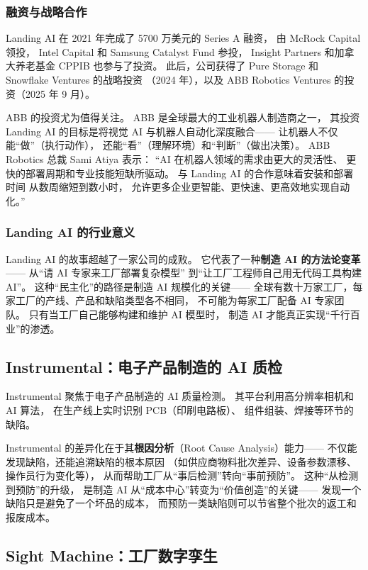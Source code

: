 \subsubsection{融资与战略合作}
Landing AI 在 2021 年完成了 5700 万美元的 Series A 融资，
由 McRock Capital 领投，
Intel Capital 和 Samsung Catalyst Fund 参投，
Insight Partners 和加拿大养老基金 CPPIB 也参与了投资。
此后，公司获得了 Pure Storage 和 Snowflake Ventures 的战略投资
（2024 年），以及 ABB Robotics Ventures 的投资（2025 年 9 月）。

ABB 的投资尤为值得关注。
ABB 是全球最大的工业机器人制造商之一，
其投资 Landing AI 的目标是将视觉 AI 与机器人自动化深度融合——
让机器人不仅能``做''（执行动作），
还能``看''（理解环境）和``判断''（做出决策）。
ABB Robotics 总裁 Sami Atiya 表示：
``AI 在机器人领域的需求由更大的灵活性、
更快的部署周期和专业技能短缺所驱动。
与 Landing AI 的合作意味着安装和部署时间
从数周缩短到数小时，
允许更多企业更智能、更快速、更高效地实现自动化。''

\subsubsection{Landing AI 的行业意义}
Landing AI 的故事超越了一家公司的成败。
它代表了一种\textbf{制造 AI 的方法论变革}——
从``请 AI 专家来工厂部署复杂模型''
到``让工厂工程师自己用无代码工具构建 AI''。
这种``民主化''的路径是制造 AI 规模化的关键——
全球有数十万家工厂，每家工厂的产线、产品和缺陷类型各不相同，
不可能为每家工厂配备 AI 专家团队。
只有当工厂自己能够构建和维护 AI 模型时，
制造 AI 才能真正实现``千行百业''的渗透。

\subsection{Instrumental：电子产品制造的 AI 质检}

Instrumental 聚焦于电子产品制造的 AI 质量检测。
其平台利用高分辨率相机和 AI 算法，
在生产线上实时识别 PCB（印刷电路板）、
组件组装、焊接等环节的缺陷。

Instrumental 的差异化在于其\textbf{根因分析}（Root Cause Analysis）能力——
不仅能发现缺陷，还能追溯缺陷的根本原因
（如供应商物料批次差异、设备参数漂移、
操作员行为变化等），
从而帮助工厂从``事后检测''转向``事前预防''。
这种``从检测到预防''的升级，
是制造 AI 从``成本中心''转变为``价值创造''的关键——
发现一个缺陷只是避免了一个坏品的成本，
而预防一类缺陷则可以节省整个批次的返工和报废成本。

\subsection{Sight Machine：工厂数字孪生}

